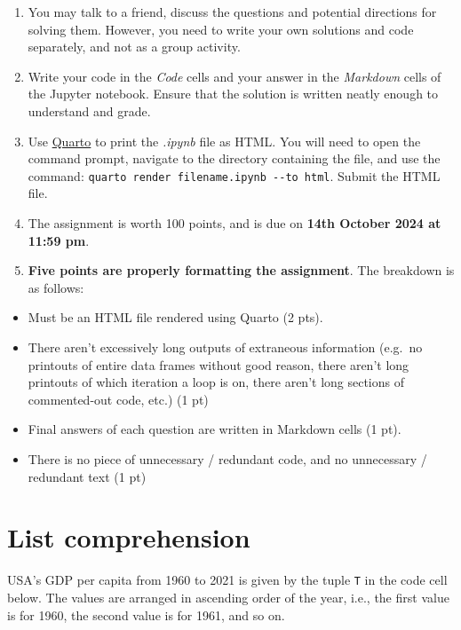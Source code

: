 \documentclass[
  letterpaper,
  DIV=11,
  numbers=noendperiod]{scrreprt}
\providecommand{\tightlist}{%
  \setlength{\itemsep}{0pt}\setlength{\parskip}{0pt}}\usepackage{longtable,booktabs,array}
\begin{document}
\begin{enumerate}
\def\labelenumi{\arabic{enumi}.}
\item
  You may talk to a friend, discuss the questions and potential
  directions for solving them. However, you need to write your own
  solutions and code separately, and not as a group activity.
\item
  Write your code in the \emph{Code} cells and your answer in the
  \emph{Markdown} cells of the Jupyter notebook. Ensure that the
  solution is written neatly enough to understand and grade.
\item
  Use
  \href{https://quarto.org/docs/output-formats/html-basics.html}{Quarto}
  to print the \emph{.ipynb} file as HTML. You will need to open the
  command prompt, navigate to the directory containing the file, and use
  the command: \texttt{quarto\ render\ filename.ipynb\ -\/-to\ html}.
  Submit the HTML file.
\item
  The assignment is worth 100 points, and is due on \textbf{14th October
  2024 at 11:59 pm}.
\item
  \textbf{Five points are properly formatting the assignment}. The
  breakdown is as follows:
\end{enumerate}

\begin{itemize}
\tightlist
\item
  Must be an HTML file rendered using Quarto (2 pts).
\item
  There aren't excessively long outputs of extraneous information
  (e.g.~no printouts of entire data frames without good reason, there
  aren't long printouts of which iteration a loop is on, there aren't
  long sections of commented-out code, etc.) (1 pt)
\item
  Final answers of each question are written in Markdown cells (1 pt).
\item
  There is no piece of unnecessary / redundant code, and no unnecessary
  / redundant text (1 pt)
\end{itemize}

\hypertarget{list-comprehension}{%
\section{List comprehension}\label{list-comprehension}}

USA's GDP per capita from 1960 to 2021 is given by the tuple \texttt{T}
in the code cell below. The values are arranged in ascending order of
the year, i.e., the first value is for 1960, the second value is for
1961, and so on.
\end{document}
